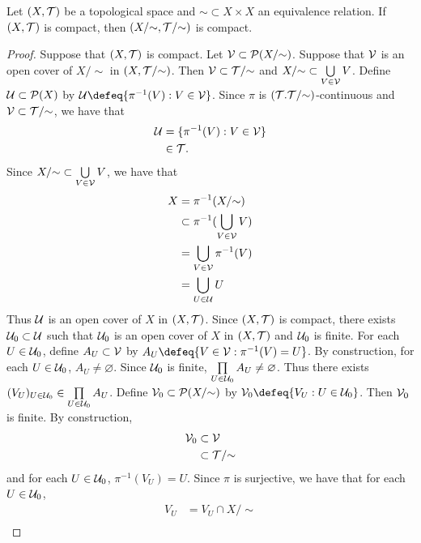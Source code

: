 \documentclass{book}
\begin{document}
	\begin{ex} 
		Let $(X, \mathcal{T})$ be a topological space and ${\sim} \subset X \times X$ an equivalence relation. If $(X, \mathcal{T})$ is compact, then $(X/{\sim}, \mathcal{T}/{\sim})$ is compact. 
	\end{ex}

	\begin{proof}
		Suppose that $(X, \mathcal{T})$ is compact. Let $\mathcal{V} \subset \mathcal{P}(X/{\sim})$. Suppose that $\mathcal{V}$ is an open cover of $X/{\sim}$ in $(X, \mathcal{T}/{\sim})$. Then $\mathcal{V} \subset \mathcal{T}/{\sim}$ and $X/{\sim} \subset \bigcup\limits_{V \in \mathcal{V}} V$. Define $\mathcal{U} \subset \mathcal{P}(X)$ by $\MU \defeq \{\pi^{-1}(V): V \in \MV\}$. Since $\pi$ is $(\mathcal{T}. \mathcal{T}/{\sim})$-continuous and $\mathcal{V} \subset \mathcal{T}/{\sim}$, we have that 
		\begin{align*}
			\mathcal{U} 
			& = \{\pi^{-1}(V): V \in \mathcal{V}\} \\
			& \in \mathcal{T}.
		\end{align*}
		Since $X/{\sim} \subset \bigcup\limits_{V \in \mathcal{V}} V$, we have that 
		\begin{align*}
			X
			& = \pi^{-1}(X/{\sim}) \\
			& \subset \pi^{-1}(\bigcup\limits_{V \in \mathcal{V}} V) \\
			& = \bigcup\limits_{V \in \mathcal{V}} \pi^{-1}(V) \\
			& = \bigcup\limits_{U \in \mathcal{U}} U \\
		\end{align*}
		Thus $\mathcal{U}$ is an open cover of $X$ in $(X, \mathcal{T})$. Since $(X, \mathcal{T})$ is compact, there exists $\mathcal{U}_0 \subset \mathcal{U}$ such that $\mathcal{U}_0$ is an open cover of $X$ in $(X, \mathcal{T})$ and $\mathcal{U}_0$ is finite. For each $U \in \mathcal{U}_0$, define $A_U \subset \mathcal{V}$ by $A_U \defeq \{V \in \MV: \pi^{-1}(V) = U\}$. By construction, for each $U \in \mathcal{U}_0$, $A_U \neq \varnothing$. Since $\mathcal{U}_0$ is finite, $\prod\limits_{U \in \mathcal{U}_0} A_U \neq \varnothing$. Thus there exists $(V_U)_{U \in \mathcal{U}_0} \in \prod\limits_{U \in \mathcal{U}_0} A_U$. Define $\mathcal{V}_0 \subset \mathcal{P}(X/{\sim})$ by $\MV_0 \defeq \{V_U:U \in \MU_0\}$. Then $\mathcal{V}_0$ is finite. By construction,  
		\begin{align*}
			\mathcal{V}_0 
			& \subset \mathcal{V} \\
			& \subset \mathcal{T}/{\sim}
		\end{align*}
		and for each $U \in \mathcal{U}_0$, $\pi^{-1}(V_U) = U$. Since $\pi$ is surjective, we have that for each $U \in \mathcal{U}_0$, 
		\begin{align*}
			V_U
			& = V_U \cap X/{\sim} \\

\end{align*}
\end{proof}
\end{document}
